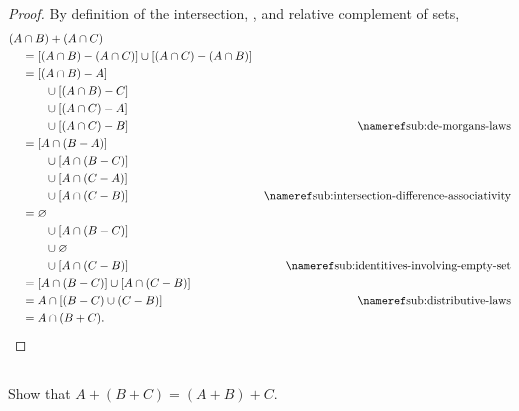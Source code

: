 \documentclass{report}
\begin{document}
\begin{proof}


  By definition of the intersection, , and
    relative complement of sets,
    \begin{align*}
      (A & \cap B) + (A \cap C) \\
        & = [(A \cap B) - (A \cap C)] \cup [(A \cap C) - (A \cap B)] \\
        & = [(A \cap B) - A] \\
          & \qquad \cup [(A \cap B) - C] \\
          & \qquad \cup [(A \cap C) - A] \\
          & \qquad \cup [(A \cap C) - B]
          & \textref{sub:de-morgans-laws} \\
        & = [A \cap (B - A)] \\
          & \qquad \cup [A \cap (B - C)] \\
          & \qquad \cup [A \cap (C - A)] \\
          & \qquad \cup [A \cap (C - B)]
          & \textref{sub:intersection-difference-associativity} \\
        & = \emptyset \\
          & \qquad \cup [A \cap (B - C)] \\
          & \qquad \cup \emptyset \\
          & \qquad \cup [A \cap (C - B)]
          & \textref{sub:identitives-involving-empty-set} \\
        & = [A \cap (B - C)] \cup [A \cap (C - B)] \\
        & = A \cap [(B - C) \cup (C - B)]
          & \textref{sub:distributive-laws} \\
        & = A \cap (B + C).
    \end{align*}

\end{proof}

\subsection{}%
\label{sub:exercise-2.15b}

Show that $A + (B + C) = (A + B) + C$.
\end{document}
